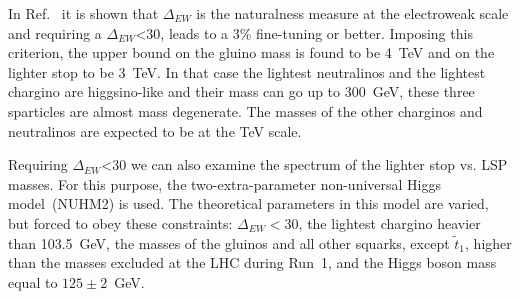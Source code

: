 


In Ref.~\cite{Baer:2016bwh} it is shown that $\Delta_{EW}$ is the naturalness measure at the electroweak scale and requiring a $\Delta_{EW}$<30, leads to a 3\% fine-tuning or better. Imposing this criterion, the upper bound on the  gluino mass is found to be 4~TeV and on the lighter stop to be 3~TeV. In that case the lightest neutralinos and the lightest chargino are higgsino-like and their mass can go up to 300~GeV, these three sparticles are almost mass degenerate. The masses of the other charginos and neutralinos are expected to be at the TeV scale.

Requiring $\Delta_{EW}$<30 we can also examine the spectrum of the lighter stop vs. LSP masses. For this purpose, the two-extra-parameter non-universal Higgs model~(NUHM2) \cite{Matalliotakis:1994ft, Baer:2005bu} is used. The theoretical parameters in this model are varied, but forced to obey these constraints: $\Delta_{EW} <30$, the lightest chargino heavier than 103.5~GeV, the masses of the gluinos and all other squarks,  except $\tilde{t}_{1}$, higher than the masses excluded at the LHC during Run~1, and the Higgs boson mass equal to $125 \pm 2$~GeV. 

